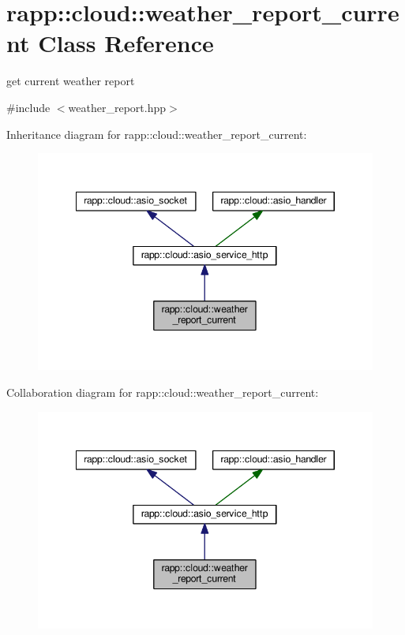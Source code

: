 \hypertarget{classrapp_1_1cloud_1_1weather__report__current}{\section{rapp\-:\-:cloud\-:\-:weather\-\_\-report\-\_\-current Class Reference}
\label{classrapp_1_1cloud_1_1weather__report__current}
}


get current weather report  




{\ttfamily \#include $<$weather\-\_\-report.\-hpp$>$}



Inheritance diagram for rapp\-:\-:cloud\-:\-:weather\-\_\-report\-\_\-current\-:
\nopagebreak
\begin{figure}[H]
\begin{center}
\leavevmode
\includegraphics[width=345pt]{classrapp_1_1cloud_1_1weather__report__current__inherit__graph}
\end{center}
\end{figure}


Collaboration diagram for rapp\-:\-:cloud\-:\-:weather\-\_\-report\-\_\-current\-:
\nopagebreak
\begin{figure}[H]
\begin{center}
\leavevmode
\includegraphics[width=345pt]{classrapp_1_1cloud_1_1weather__report__current__coll__graph}
\end{center}
\end{figure}
